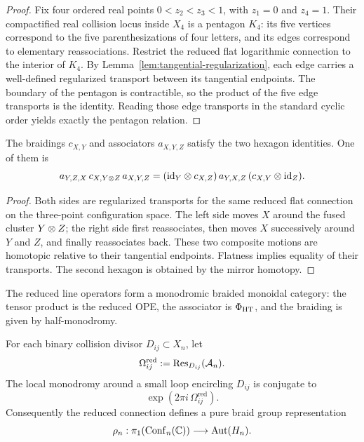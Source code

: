 \begin{proof}
Fix four ordered real points $0<z_2<z_3<1$, with $z_1=0$ and $z_4=1$. Their compactified real collision locus inside $X_4$ is a pentagon $K_4$: its five vertices correspond to the five parenthesizations of four letters, and its edges correspond to elementary reassociations. Restrict the reduced flat logarithmic connection to the interior of $K_4$. By Lemma~\ref{lem:tangential-regularization}, each edge carries a well-defined regularized transport between its tangential endpoints. The boundary of the pentagon is contractible, so the product of the five edge transports is the identity. Reading those edge transports in the standard cyclic order yields exactly the pentagon relation.
\end{proof}

\begin{theorem}\label{thm:hexagon}
The braidings $c_{X,Y}$ and associators $a_{X,Y,Z}$ satisfy the two hexagon identities. One of them is
\[
 a_{Y,Z,X}\,c_{X,Y\otimes Z}\,a_{X,Y,Z}
 =
 (\mathrm{id}_Y\otimes c_{X,Z})\,a_{Y,X,Z}\,(c_{X,Y}\otimes \mathrm{id}_Z).
\]
\end{theorem}

\begin{proof}
Both sides are regularized transports for the same reduced flat connection on the three-point configuration space. The left side moves $X$ around the fused cluster $Y\otimes Z$; the right side first reassociates, then moves $X$ successively around $Y$ and $Z$, and finally reassociates back. These two composite motions are homotopic relative to their tangential endpoints. Flatness implies equality of their transports. The second hexagon is obtained by the mirror homotopy.
\end{proof}

\begin{corollary}\label{cor:braided-category}
The reduced line operators form a monodromic braided monoidal category: the tensor product is the reduced OPE, the associator is $\Phi_{\mathrm{HT}}$, and the braiding is given by half-monodromy.
\end{corollary}

\begin{theorem}\label{thm:pure-braid}
For each binary collision divisor $D_{ij}\subset X_n$, let
\[
 \Omega_{ij}^{\mathrm{red}}:=\mathrm{Res}_{D_{ij}}(\mathcal A_n).
\]
The local monodromy around a small loop encircling $D_{ij}$ is conjugate to
\[
 \exp(2\pi i\,\Omega_{ij}^{\mathrm{red}}).
\]
Consequently the reduced connection defines a pure braid group representation
\[
 \rho_n: \pi_1(\mathrm{Conf}_n(\mathbb C)) \longrightarrow \mathrm{Aut}(H_n).
\]
\end{theorem}

